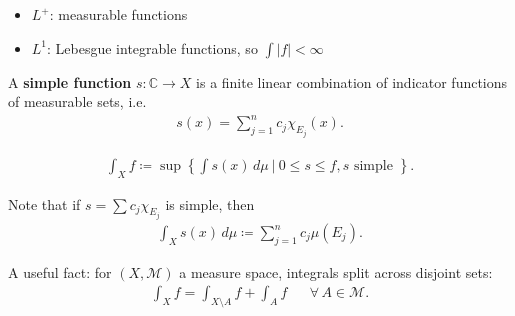 \begin{remark}[on notation]

\envlist

\begin{itemize}
\tightlist
\item
  \(L^+\): measurable functions
\item
  \(L^1\): Lebesgue integrable functions, so
  \(\int {\left\lvert {f} \right\rvert} < \infty\)
\end{itemize}

\end{remark}

\begin{definition}

A \textbf{simple function} \(s: {\mathbb{C}}\to X\) is a finite linear
combination of indicator functions of measurable sets, i.e.~
\begin{align*}
s(x) = \sum_{j=1}^n c_j \chi_{E_j}(x)
.\end{align*}

\end{definition}

\begin{definition}

\begin{align*}
\int_X f \coloneqq\sup \left\{{ \int s(x) \,d\mu{~\mathrel{\Big|}~}0\leq s \leq f, s\text{ simple } }\right\} 
.\end{align*}

Note that if \(s = \sum c_j \chi_{E_j}\) is simple, then
\begin{align*}
\int_X s(x) \,d\mu\coloneqq\sum_{j=1}^n c_j \mu(E_j)
.\end{align*}

\end{definition}

\begin{remark}

A useful fact: for \((X, \mathcal{M})\) a measure space, integrals split
across disjoint sets:
\begin{align*}
\int_X f = \int_{X\setminus A} f + \int_A f && \forall\, A \in \mathcal{M} 
.\end{align*}

\end{remark}

